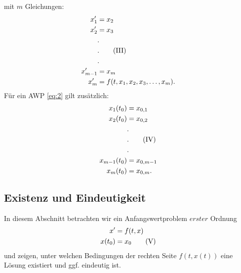 mit $m$ Gleichungen:
\begin{align*}
    x_{1}^{\prime}&=x_{2} \\
    x_{2}^{\prime}&=x_{3} \\
    &. \\
    &. \label{eq:3} \tag{\RNum{3}}\\
    &. \\
    x_{m-1}^{\prime}&=x_{m} \\
    x_{m}^{\prime}&=f(t, x_{1}, x_{2}, x_{3}, \ldots, x_{m}). \\
\end{align*}
Für ein AWP \eqref{eq:2} gilt zusätzlich:
\begin{align*}
    x_{1}(t_{0})&=x_{0,1} \\
    x_{2}(t_{0})&=x_{0,2} \\
    &. \\
    &. \label{eq:4} \tag{\RNum{4}}\\
    &. \\
    x_{m-1}(t_{0})&=x_{0,m-1} \\
    x_{m}(t_{0})&=x_{0,m}. \\
\end{align*}

\subsection{Existenz und Eindeutigkeit}
In diesem Abschnitt betrachten wir ein Anfangswertproblem $erster$ Ordnung
\begin{align*}
    x^{\prime}&=f(t,x)\\
    x(t_{0})&=x_{0} \label{eq:5} \tag{\RNum{5}}
\end{align*}
und zeigen, unter welchen Bedingungen der rechten Seite $f(t,x(t))$ eine Lösung existiert und ggf. eindeutig ist.

